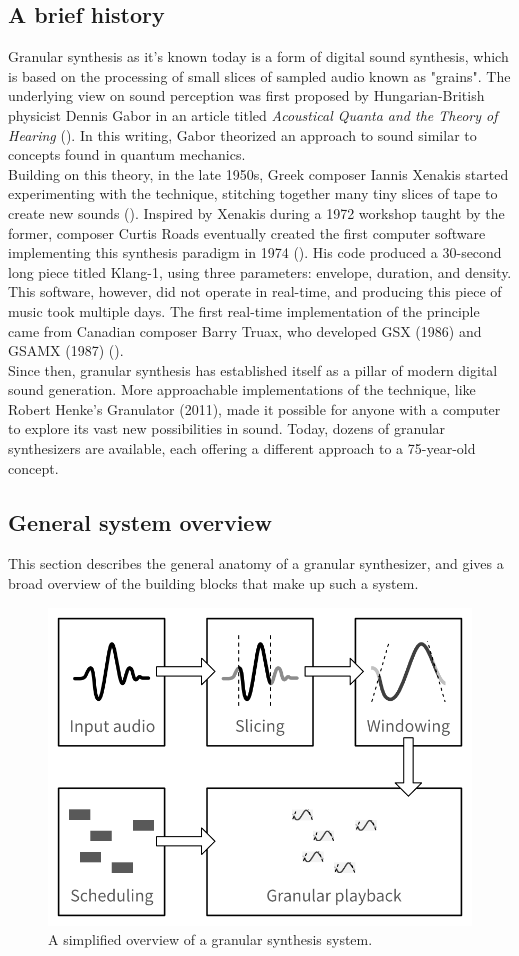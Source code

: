 \documentclass[10pt, twocolumn]{IEEEtran}
\begin{document}
\subsection{A brief history}
Granular synthesis as it's known today is a form of digital sound synthesis, which is based on the processing of small slices of sampled audio known as "grains". The underlying view on sound perception was first proposed by Hungarian-British physicist Dennis Gabor in an article titled \textit{Acoustical Quanta and the Theory of Hearing} (\cite{gabor47}). In this writing, Gabor theorized an approach to sound similar to concepts found in quantum mechanics.\\ Building on this theory, in the late 1950s, Greek composer Iannis Xenakis started experimenting with the technique, stitching together many tiny slices of tape to create new sounds (\cite{robindore96}). Inspired by Xenakis during a 1972 workshop taught by the former, composer Curtis Roads eventually created the first computer software implementing this synthesis paradigm in 1974 (\cite{opie03}). His code produced a 30-second long piece titled Klang-1, using three parameters: envelope, duration, and density. This software, however, did not operate in real-time, and producing this piece of music took multiple days. The first real-time implementation of the principle came from Canadian composer Barry Truax, who developed GSX (1986) and GSAMX (1987) (\cite{truax88}). \\
Since then, granular synthesis has established itself as a pillar of modern digital sound generation. More approachable implementations of the technique, like Robert Henke's Granulator (2011), made it possible for anyone with a computer to explore its vast new possibilities in sound. Today, dozens of granular synthesizers are available, each offering a different approach to a 75-year-old concept.

\subsection{General system overview}
This section describes the general anatomy of a granular synthesizer, and gives a broad overview of the building blocks that make up such a system. 

\begin{figure}[ht!]
	\centering
	\includegraphics[width=0.75\linewidth]{GranularDiagram.png}
	\caption{A simplified overview of a granular synthesis system.}
	\label{fig:block_diagram}
\end{figure}
\end{document}

